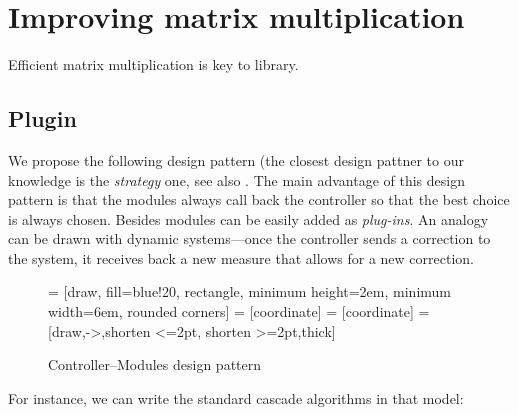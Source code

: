 \section{Improving \linbox matrix multiplication}\label{sec:matmul}
%
Efficient matrix multiplication is key to \linbox library.
%
\subsection{Plugin}
%
We propose the following design pattern (the closest design pattner to our
knowledge is the \emph{strategy} one, see also \cite[Fig 2.]{Cung:2006:TC}.
The main advantage of this design pattern is that the modules always call back
the controller so that the best choice is always chosen.  Besides modules can
be easily added as \emph{plug-ins}.  An analogy can be drawn with dynamic
systems---once the controller sends a correction to the system, it receives
back a new measure that allows for a new correction.
%
\par
%
\begin{figure}[htbp]
 = [draw, fill=blue!20, rectangle,
    minimum height=2em, minimum width=6em, rounded corners]
 = [coordinate]
 = [coordinate]
 = [draw,->,shorten <=2pt, shorten >=2pt,thick]
        \centering
{}
\caption{Controller--Modules design pattern}
\label{fig:diag:patt}
\end{figure}
%
For instance, we can write the standard cascade algorithms in that model:
%
\par
%
